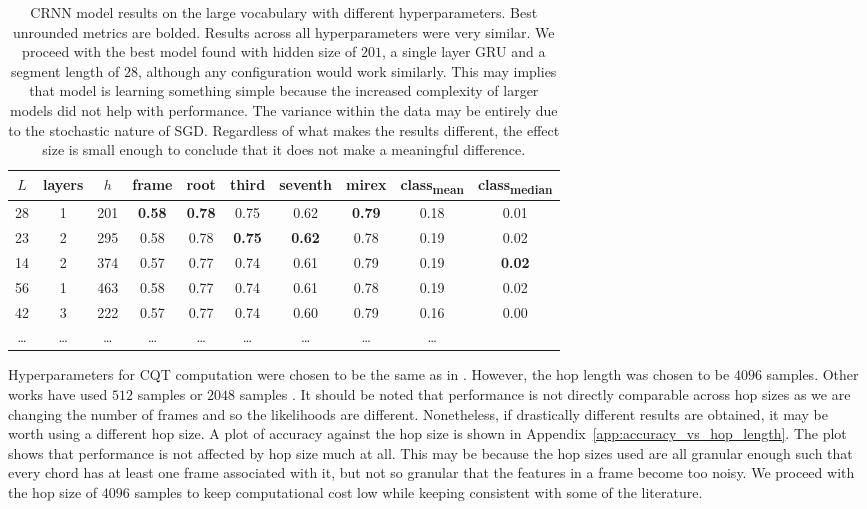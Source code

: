 \begin{table}[H]
    \centering
    \begin{tabular}{cccccccccc}
        \toprule
        $L$ & layers & $h$ & frame & root & third & seventh & mirex & class\textsubscript{mean} & class\textsubscript{median} \\
        \midrule
        28 & 1 & 201 & \textbf{0.58} & \textbf{0.78} & 0.75 & 0.62 & \textbf{0.79} & 0.18 & 0.01 \\
        23 & 2 & 295 & 0.58 & 0.78 & \textbf{0.75} & \textbf{0.62} & 0.78 & 0.19 & 0.02 \\
        14 & 2 & 374 & 0.57 & 0.77 & 0.74 & 0.61 & 0.79 & 0.19 & \textbf{0.02} \\
        56 & 1 & 463 & 0.58 & 0.77 & 0.74 & 0.61 & 0.78 & 0.19 & 0.02 \\
        42 & 3 & 222 & 0.57 & 0.77 & 0.74 & 0.60 & 0.79 & 0.16 & 0.00 \\
        \ldots & \ldots & \ldots & \ldots & \ldots & \ldots & \ldots & \ldots & \ldots \\
        \bottomrule
    \end{tabular}
    \caption{CRNN model results on the large vocabulary with different hyperparameters. Best unrounded metrics are bolded. Results across all hyperparameters were very similar. We proceed with the best model found with hidden size of $201$, a single layer GRU and a segment length of $28$, although any configuration would work similarly. This may implies that model is learning something simple because the increased complexity of larger models did not help with performance. The variance within the data may be entirely due to the stochastic nature of SGD. Regardless of what makes the results different, the effect size is small enough to conclude that it does not make a meaningful difference.}\label{tab:crnn_hparams}
\end{table}

Hyperparameters for CQT computation were chosen to be the same as in \citet{StructuredTraining}. However, the hop length was chosen to be $4096$ samples. Other works have used $512$ samples \citet{ACRLargeVocab1} or $2048$ samples \citet{CurriculumLearning}. It should be noted that performance is not directly comparable across hop sizes as we are changing the number of frames and so the likelihoods are different. Nonetheless, if drastically different results are obtained, it may be worth using a different hop size. A plot of accuracy against the hop size is shown in Appendix~\ref{app:accuracy_vs_hop_length}. The plot shows that performance is not affected by hop size much at all. This may be because the hop sizes used are all granular enough such that every chord has at least one frame associated with it, but not so granular that the features in a frame become too noisy. We proceed with the hop size of $4096$ samples to keep computational cost low while keeping consistent with some of the literature.

